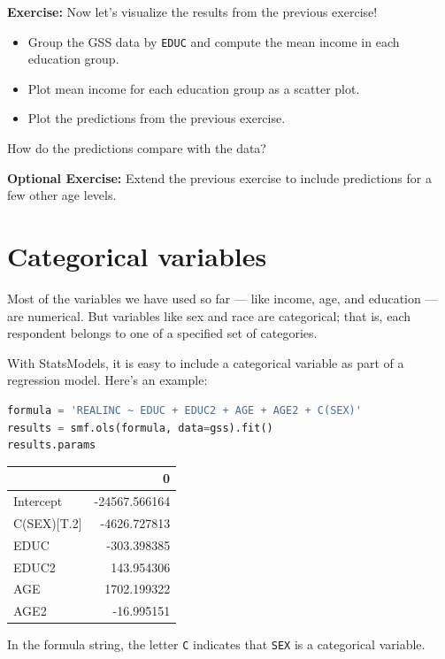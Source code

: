 \textbf{Exercise:} Now let's visualize the results from the previous
exercise!

\begin{itemize}
\item
  Group the GSS data by \passthrough{\lstinline!EDUC!} and compute the
  mean income in each education group.
\item
  Plot mean income for each education group as a scatter plot.
\item
  Plot the predictions from the previous exercise.
\end{itemize}

How do the predictions compare with the data?

\textbf{Optional Exercise:} Extend the previous exercise to include
predictions for a few other age levels.

\hypertarget{categorical-variables}{%
\section{Categorical variables}\label{categorical-variables}}

Most of the variables we have used so far --- like income, age, and
education --- are numerical. But variables like sex and race are
categorical; that is, each respondent belongs to one of a specified set
of categories.

With StatsModels, it is easy to include a categorical variable as part
of a regression model. Here's an example:

\begin{lstlisting}[language=Python,style=source]
formula = 'REALINC ~ EDUC + EDUC2 + AGE + AGE2 + C(SEX)'
results = smf.ols(formula, data=gss).fit()
results.params
\end{lstlisting}

\begin{tabular}{lr}
\toprule
{} &             0 \\
\midrule
Intercept   & -24567.566164 \\
C(SEX)[T.2] &  -4626.727813 \\
EDUC        &   -303.398385 \\
EDUC2       &    143.954306 \\
AGE         &   1702.199322 \\
AGE2        &    -16.995151 \\
\bottomrule
\end{tabular}

In the formula string, the letter \passthrough{\lstinline!C!} indicates
that \passthrough{\lstinline!SEX!} is a categorical variable.

